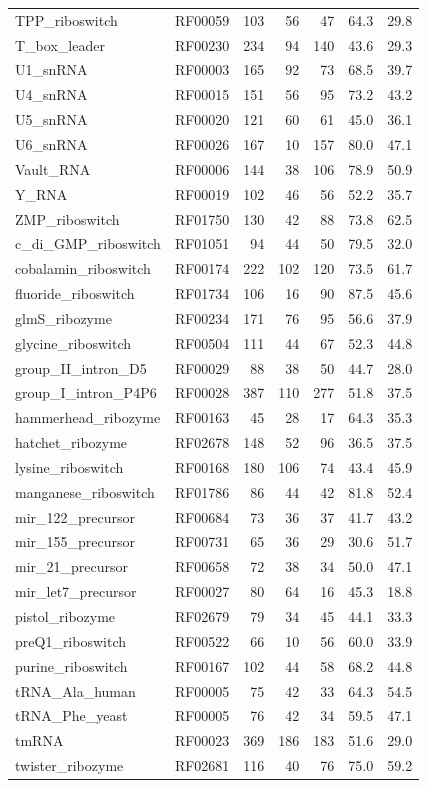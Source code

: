 \documentclass[11pt]{article}
\begin{document}
\begin{table}[htbp]
\begin{tabular}{llrrrcc}
TPP\_riboswitch & RF00059 & 103 & 56 & 47 & 64.3 & 29.8 \\
T\_box\_leader & RF00230 & 234 & 94 & 140 & 43.6 & 29.3 \\
U1\_snRNA & RF00003 & 165 & 92 & 73 & 68.5 & 39.7 \\
U4\_snRNA & RF00015 & 151 & 56 & 95 & 73.2 & 43.2 \\
U5\_snRNA & RF00020 & 121 & 60 & 61 & 45.0 & 36.1 \\
U6\_snRNA & RF00026 & 167 & 10 & 157 & 80.0 & 47.1 \\
Vault\_RNA & RF00006 & 144 & 38 & 106 & 78.9 & 50.9 \\
Y\_RNA & RF00019 & 102 & 46 & 56 & 52.2 & 35.7 \\
ZMP\_riboswitch & RF01750 & 130 & 42 & 88 & 73.8 & 62.5 \\
c\_di\_GMP\_riboswitch & RF01051 & 94 & 44 & 50 & 79.5 & 32.0 \\
cobalamin\_riboswitch & RF00174 & 222 & 102 & 120 & 73.5 & 61.7 \\
fluoride\_riboswitch & RF01734 & 106 & 16 & 90 & 87.5 & 45.6 \\
glmS\_ribozyme & RF00234 & 171 & 76 & 95 & 56.6 & 37.9 \\
glycine\_riboswitch & RF00504 & 111 & 44 & 67 & 52.3 & 44.8 \\
group\_II\_intron\_D5 & RF00029 & 88 & 38 & 50 & 44.7 & 28.0 \\
group\_I\_intron\_P4P6 & RF00028 & 387 & 110 & 277 & 51.8 & 37.5 \\
hammerhead\_ribozyme & RF00163 & 45 & 28 & 17 & 64.3 & 35.3 \\
hatchet\_ribozyme & RF02678 & 148 & 52 & 96 & 36.5 & 37.5 \\
lysine\_riboswitch & RF00168 & 180 & 106 & 74 & 43.4 & 45.9 \\
manganese\_riboswitch & RF01786 & 86 & 44 & 42 & 81.8 & 52.4 \\
mir\_122\_precursor & RF00684 & 73 & 36 & 37 & 41.7 & 43.2 \\
mir\_155\_precursor & RF00731 & 65 & 36 & 29 & 30.6 & 51.7 \\
mir\_21\_precursor & RF00658 & 72 & 38 & 34 & 50.0 & 47.1 \\
mir\_let7\_precursor & RF00027 & 80 & 64 & 16 & 45.3 & 18.8 \\
pistol\_ribozyme & RF02679 & 79 & 34 & 45 & 44.1 & 33.3 \\
preQ1\_riboswitch & RF00522 & 66 & 10 & 56 & 60.0 & 33.9 \\
purine\_riboswitch & RF00167 & 102 & 44 & 58 & 68.2 & 44.8 \\
tRNA\_Ala\_human & RF00005 & 75 & 42 & 33 & 64.3 & 54.5 \\
tRNA\_Phe\_yeast & RF00005 & 76 & 42 & 34 & 59.5 & 47.1 \\
tmRNA & RF00023 & 369 & 186 & 183 & 51.6 & 29.0 \\
twister\_ribozyme & RF02681 & 116 & 40 & 76 & 75.0 & 59.2 \\
\bottomrule
\end{tabular}
\end{table}
\end{document}
